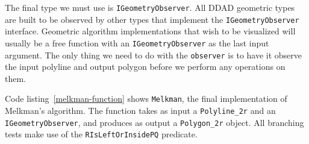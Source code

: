 The final type we must use is \texttt{IGeometryObserver}. All DDAD geometric
types are built to be observed by other types that implement the
\texttt{IGeometryObserver} interface. Geometric algorithm implementations that
wish to be visualized will usually be a free function with an
\texttt{IGeometryObserver} as the last input argument. The only thing we need to
do with the \texttt{observer} is to have it observe the input polyline and
output polygon before we perform any operations on them.

Code listing~\ref{melkman-function} shows \texttt{Melkman}, the final 
implementation of Melkman's algorithm. The function takes as input a 
\texttt{Polyline\_2r} and an \texttt{IGeometryObserver}, and produces as output
a \texttt{Polygon\_2r} object. All branching tests make use of the
\texttt{RIsLeftOrInsidePQ} predicate.
 


% 

% 
% 
% 



